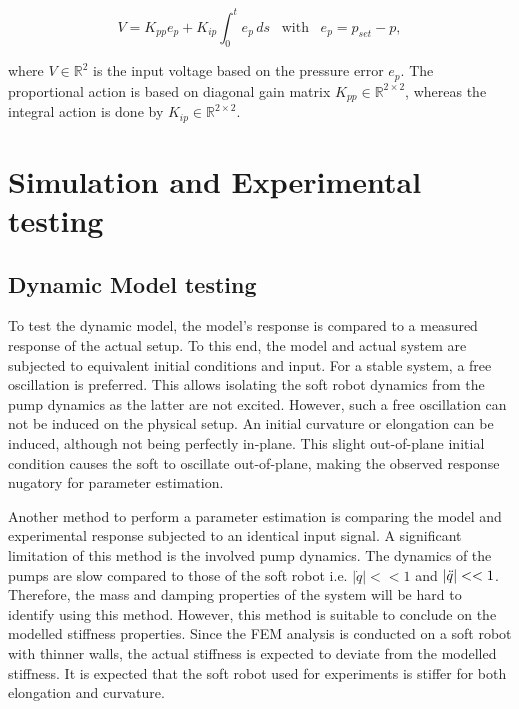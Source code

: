 \begin{equation}
    V = K_{pp}e_p + K_{ip} \int_0^t e_p \hspace{2pt} ds \hspace{10pt} \text{with} \hspace{10pt} e_p = p_{set} - p,
\end{equation}

where $V \in \mathbb{R}^2$ is the input voltage based on the pressure error $e_p$. The proportional action is based on diagonal gain matrix $K_{pp} \in \mathbb{R}^{2\times 2}$, whereas the integral action is done by $K_{ip} \in \mathbb{R}^{2\times 2}$.







\label{chap4b}

\section{Simulation and Experimental testing}


\subsection{Dynamic Model testing}
\label{subsecDMt}


To test the dynamic model, the model's response is compared to a measured response of the actual setup. To this end, the model and actual system are subjected to equivalent initial conditions and input. For a stable system, a free oscillation is preferred. This allows isolating the soft robot dynamics from the pump dynamics as the latter are not excited. However, such a free oscillation can not be induced on the physical setup. An initial curvature or elongation can be induced, although not being perfectly in-plane. This slight out-of-plane initial condition causes the soft to oscillate out-of-plane, making the observed response nugatory for parameter estimation.


Another method to perform a parameter estimation is comparing the model and experimental response subjected to an identical input signal. A significant limitation of this method is the involved pump dynamics. The dynamics of the pumps are slow compared to those of the soft robot i.e. $|\dot{q}|<< 1$ and $|\Ddot{q}|<< 1 $. Therefore, the mass and damping properties of the system will be hard to identify using this method. However, this method is suitable to conclude on the modelled stiffness properties. Since the FEM analysis is conducted on a soft robot with thinner walls, the actual stiffness is expected to deviate from the modelled stiffness. It is expected that the soft robot used for experiments is stiffer for both elongation and curvature. 

